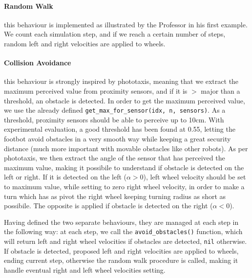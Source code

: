 \paragraph{Random Walk} this behaviour is implemented as illustrated by the
Professor in his first example. We count each simulation step, and if we reach
a certain number of steps, random left and right velocities are applied to
wheels.

\paragraph{Collision Avoidance} this behaviour is strongly inspired by
phototaxis, meaning that we extract the maximum perceived value from proximity
sensors, and if it is $>$ major than a threshold, an obstacle is detected. In
order to get the maximum perceived value, we use the already defined
\texttt{get\_max\_for\_sensor(idx, n, sensors)}. As a threshold, proximity
sensors should be able to perceive up to 10cm. With experimental evaluation, a
good threshold has been found at 0.55, letting the footbot avoid obstacles in a
very smooth way while keeping a great security distance (much more important
with movable obstacles like other robots). As per phototaxis, we then extract
the angle of the sensor that has perceived the maximum value, making it
possibile to understand if obstacle is detected on the left or right. If it is
detected on the left ($\alpha > 0$), left wheel velocity should be set to
maximum value, while setting to zero right wheel velocity, in order to make a
turn which has as pivot the right wheel keeping turning radius as short as
possibile. The opposite is applied if obstacle is detected on the right
($\alpha < 0$).

\bigskip
\noindent
Having defined the two separate behaviours, they are managed at each step in
the following way: at each step, we call the \texttt{avoid\_obstacles()}
function, which will return left and right wheel velocities if obstacles are
detected, \texttt{nil} otherwise. If obstacle is detected, proposed left and
right velocities are applied to wheels, ending current step, otherwise the
random walk procedure is called, making it handle eventual right and left wheel
velocities setting.

